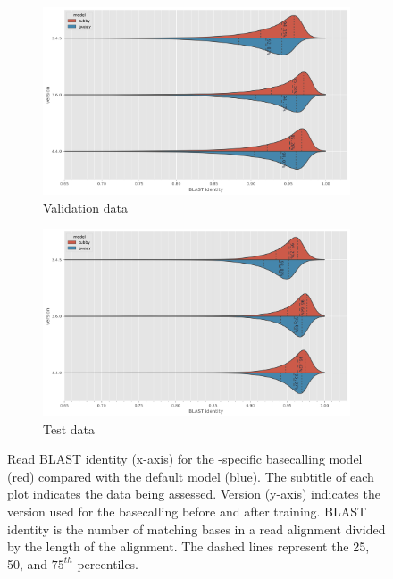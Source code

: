 \begin{figure}
     \centering
     \begin{subfigure}[b]{0.9\textwidth}
        \includegraphics[width=1\linewidth]{Chapter4/Figs/read_blast_identity.png}
        \centering
        \caption{Validation data}
        \label{fig:eval-read-blast}
     \end{subfigure}
     \hfill
     \begin{subfigure}[b]{0.9\textwidth}
         \centering
        \includegraphics[width=1\linewidth]{Chapter4/Figs/test_read_blast_identity.png}
         \caption{Test data}
         \label{fig:test-read-blast}
     \end{subfigure}
    \caption{Read BLAST identity (x-axis) for the \mtb{}-specific basecalling model \tubby{} (red) compared with the default \guppy{} model (blue). The subtitle of each plot indicates the data being assessed. Version (y-axis) indicates the \guppy{} version used for the basecalling before and after training. BLAST identity is the number of matching bases in a read alignment divided by the length of the alignment. The dashed lines represent the 25, 50, and $75^{th}$ percentiles.}
        \label{fig:read-blast}
\end{figure}

